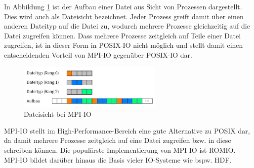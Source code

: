 In Abbildung \ref{fig:dateisicht} ist der Aufbau einer Datei aus Sicht von Prozessen dargestellt. Dies wird auch als Dateisicht bezeichnet. Jeder Prozess greift damit \"uber einen anderen Dateityp auf die Datei zu, wodurch mehrere Prozesse gleichzeitig auf die Datei zugreifen k\"onnen. Dass mehrere Prozesse zeitgleich auf Teile einer Datei zugreifen, ist in dieser Form in POSIX-IO nicht m\"oglich und stellt damit einen entscheidenden Vorteil von MPI-IO gegen\"uber POSIX-IO dar.

\begin{figure}[h]
	\centering
	\includegraphics[width=7cm]{fig/Dateisicht.JPG}
	\caption{Dateisicht bei MPI-IO \cite{Kuhn.13.05.2016}}
	\label{fig:dateisicht}
\end{figure}
MPI-IO stellt im High-Performance-Bereich eine gute Alternative zu POSIX dar, da damit mehrere Prozesse zeitgleich auf eine Datei zugreifen bzw. in diese schreiben k\"onnen. Die popul\"arste Implementierung von MPI-IO ist ROMIO. MPI-IO bildet dar\"uber hinaus die Basis vieler IO-Systeme wie bspw. HDF.\cite{Corbett.1995}\cite{Kuhn.13.05.2016}
